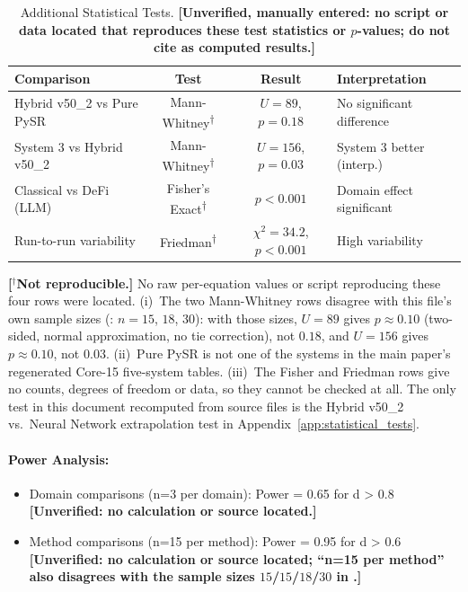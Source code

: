 \documentclass[twoside,11pt]{article}
\begin{document}
\begin{table}[H]
\centering
\caption{Additional Statistical Tests.
  \textbf{[Unverified, manually entered: no script or data located that reproduces
  these test statistics or $p$-values; do not cite as computed results.]}}
\label{tab:additional_stats}
{\small\begin{tabular}{@{}lccl@{}}
\toprule
\textbf{Comparison} & \textbf{Test} & \textbf{Result} & \textbf{Interpretation} \\
\midrule
Hybrid v50\_2 vs Pure PySR & Mann-Whitney\textsuperscript{$\dagger$} & $U = 89$, $p = 0.18$ & No significant difference \\
System 3 vs Hybrid v50\_2 & Mann-Whitney\textsuperscript{$\dagger$} & $U = 156$, $p = 0.03$ & System 3 better (interp.) \\
Classical vs DeFi (LLM) & Fisher's Exact\textsuperscript{$\dagger$} & $p < 0.001$ & Domain effect significant \\
Run-to-run variability & Friedman\textsuperscript{$\dagger$} & $\chi^2 = 34.2$, $p < 0.001$ & High variability \\
\bottomrule
\end{tabular}}

\smallskip
{\footnotesize\textbf{[$^\dagger$Not reproducible.]} No raw per-equation values or script
reproducing these four rows were located. (i)~The two Mann-Whitney rows disagree with this
file's own sample sizes (: $n=15$, $18$, $30$): with those
sizes, $U=89$ gives $p\approx0.10$ (two-sided, normal approximation, no tie correction),
not $0.18$, and $U=156$ gives $p\approx0.10$, not $0.03$. (ii)~Pure PySR is not one of the
systems in the main paper's regenerated Core-15 five-system tables. (iii)~The Fisher and
Friedman rows give no counts, degrees of freedom or data, so they cannot be checked at all.
The only test in this document recomputed from source files is the Hybrid v50\_2 vs.\ Neural
Network extrapolation test in Appendix~\ref{app:statistical_tests}.}
\end{table}

\paragraph{Power Analysis:}
\begin{itemize}
\item Domain comparisons (n=3 per domain): Power = 0.65 for d > 0.8 \textbf{[Unverified: no calculation or source located.]}
\item Method comparisons (n=15 per method): Power = 0.95 for d > 0.6 \textbf{[Unverified: no calculation or source located; ``n=15 per method'' also disagrees with the sample sizes $15$/$15$/$18$/$30$ in .]}
\end{itemize}
\end{document}
